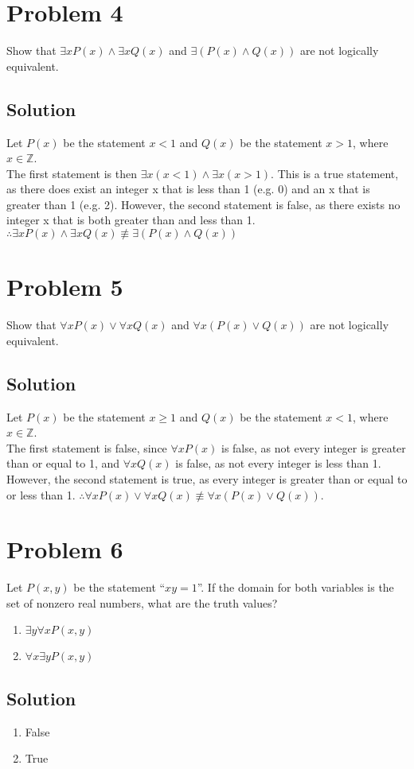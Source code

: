 \documentclass[table]{article}
\begin{document}
\section{Problem 4}
Show that $\exists xP(x) \land \exists xQ(x)$ and $\exists (P(x) \land Q(x))$ are not logically equivalent.
\subsection{Solution}
Let $P(x)$ be the statement $x < 1$ and $Q(x)$ be the statement $x > 1$, where $x \in \mathbb{Z}$.\\
The first statement is then $\exists x(x < 1) \land \exists x(x > 1)$. This is a true statement, as there does exist an integer x that is less than 1 (e.g. 0) and an x that is greater than 1 (e.g. 2). However, the second statement is false, as there exists no integer x that is both greater than and less than 1. $\therefore \exists xP(x) \land \exists xQ(x) \not\equiv \exists (P(x) \land Q(x))$
\section{Problem 5}
Show that $\forall xP(x) \lor \forall xQ(x)$ and $\forall x(P(x) \lor Q(x))$ are not logically equivalent.
\subsection{Solution}
Let $P(x)$ be the statement $x \geq 1$ and $Q(x)$ be the statement $x < 1$, where $x \in \mathbb{Z}$.\\
The first statement is false, since $\forall xP(x)$ is false, as not every integer is greater than or equal to 1, and $\forall xQ(x)$ is false, as not every integer is less than 1. However, the second statement is true, as every integer is greater than or equal to or less than 1. $\therefore \forall xP(x) \lor \forall xQ(x) \not\equiv \forall x(P(x) \lor Q(x))$.
\section{Problem 6}
Let $P(x,y)$ be the statement ``$xy=1$''. If the domain for both variables is the set of nonzero real numbers, what are the truth values?
\begin{enumerate}[nosep, label=\alph*)]
\item $\exists y \forall x P(x,y)$
\item $\forall x \exists y P(x,y)$
\end{enumerate}
\subsection{Solution}
\begin{enumerate}[nosep, label=\alph*)]
\item False
\item True
\end{enumerate}
\end{document}
